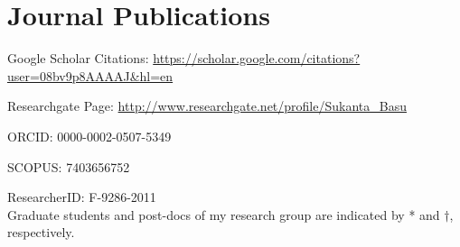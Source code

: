 \nocite{*}

  {\list
     {}
     {%
      \setlength{\leftmargin}{\labelwidth}%
      \setlength{\labelsep}{\biblabelsep}%
      \addtolength{\leftmargin}{\labelsep}%
      \setlength{\itemsep}{\bibitemsep}%
      \setlength{\parsep}{\bibparsep}
      }%
      \renewcommand*{\makelabel}[1]{\hss##1}}
  {\endlist}
  {\item}

\section*{Journal Publications}

\noindent Google Scholar Citations: \url{https://scholar.google.com/citations?user=08bv9p8AAAAJ\&hl=en}

\noindent Researchgate Page: \url{http://www.researchgate.net/profile/Sukanta\_Basu}

\noindent ORCID: 0000-0002-0507-5349

\noindent SCOPUS: 7403656752

\noindent ResearcherID: F-9286-2011\\

\noindent Graduate students and post-docs of my research group are indicated by * and $\dagger$, respectively. 

\printbibliography[heading=none,type=article]
